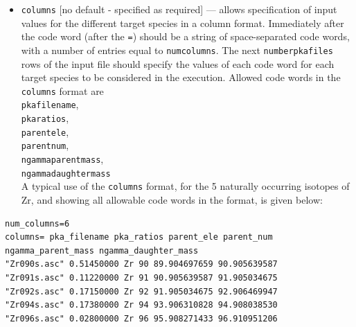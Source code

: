 \documentclass[a4paper]{article}
\begin{document}
\begin{itemize}
\item \texttt{columns} [no default - specified as required] --- allows specification of input values for the different target species in a column format. Immediately after the code word (after the \texttt{=}) should be a string of space-separated code words, with a number of entries equal to \texttt{num{\textunderscore}columns}. The next \texttt{number{\textunderscore}pka{\textunderscore}files} rows of the input file should specify the values of each code word for each target species to be considered in the execution. Allowed code words in the \texttt{columns} format are\\ \texttt{pka{\textunderscore}filename},\\\texttt{pka{\textunderscore}ratios},\\ \texttt{parent{\textunderscore}ele},\\\texttt{parent{\textunderscore}num},\\ \texttt{ngamma{\textunderscore}parent{\textunderscore}mass},\\ \texttt{ngamma{\textunderscore}daughter{\textunderscore}mass}\\
    A typical use of the \texttt{columns} format, for the 5 naturally occurring isotopes of Zr, and showing all allowable code words in the format, is given below:
\end{itemize}


{\footnotesize
\begin{verbatim}
num_columns=6
columns= pka_filename pka_ratios parent_ele parent_num ngamma_parent_mass ngamma_daughter_mass
"Zr090s.asc" 0.51450000 Zr 90 89.904697659 90.905639587
"Zr091s.asc" 0.11220000 Zr 91 90.905639587 91.905034675
"Zr092s.asc" 0.17150000 Zr 92 91.905034675 92.906469947
"Zr094s.asc" 0.17380000 Zr 94 93.906310828 94.908038530
"Zr096s.asc" 0.02800000 Zr 96 95.908271433 96.910951206
\end{verbatim}}

\end{document}
